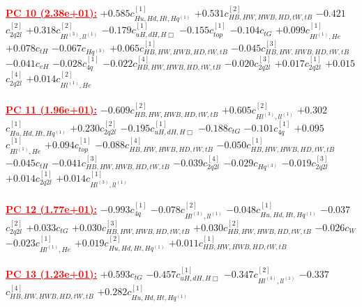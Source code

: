 \documentclass{article}
\begin{document}
\noindent \textcolor{red}{\underline{\bf{PC 10} (2.38e+01):}}
{$+0.585$}{\rm $c_{Hu,Hd,Ht,Hq^{(1)}}^{[1]}$} 
{$+0.531$}{\rm $c_{HB,HW,HWB,HD,tW,tB}^{[2]}$} 
{$-0.421$}{\rm $c_{2q2l}^{[2]}$} 
{$+0.318$}{\rm $c_{Hl^{(3)},ll^{(1)}}^{[2]}$} 
{$-0.179$}{\rm $c_{uH,dH,H\Box}^{[1]}$} 
{$-0.155$}{\rm $c_{top}^{[1]}$} 
{$-0.104$}{\rm $c_{tG}$} 
{$+0.099$}{\rm $c_{Hl^{(1)},He}^{[1]}$} 
{$+0.078$}{\rm $c_{tH}$} 
{$-0.067$}{\rm $c_{Hq^(3)}$} 
{$+0.065$}{\rm $c_{HB,HW,HWB,HD,tW,tB}^{[1]}$} 
{$-0.045$}{\rm $c_{HB,HW,HWB,HD,tW,tB}^{[3]}$} 
{$-0.041$}{\rm $c_{eH}$} 
{$-0.028$}{\rm $c_{4q}^{[1]}$} 
{$-0.022$}{\rm $c_{HB,HW,HWB,HD,tW,tB}^{[4]}$} 
{$-0.020$}{\rm $c_{2q2l}^{[3]}$} 
{$+0.017$}{\rm $c_{2q2l}^{[1]}$} 
{$+0.015$}{\rm $c_{2q2l}^{[4]}$} 
{$+0.014$}{\rm $c_{Hl^{(1)},He}^{[2]}$} 
 \nonumber \\ \nonumber \\ 
\noindent \textcolor{red}{\underline{\bf{PC 11} (1.96e+01):}}
{$-0.609$}{\rm $c_{HB,HW,HWB,HD,tW,tB}^{[2]}$} 
{$+0.605$}{\rm $c_{Hl^{(3)},ll^{(1)}}^{[2]}$} 
{$+0.302$}{\rm $c_{Hu,Hd,Ht,Hq^{(1)}}^{[1]}$} 
{$+0.230$}{\rm $c_{2q2l}^{[2]}$} 
{$-0.195$}{\rm $c_{uH,dH,H\Box}^{[1]}$} 
{$-0.188$}{\rm $c_{tG}$} 
{$-0.101$}{\rm $c_{4q}^{[1]}$} 
{$+0.095$}{\rm $c_{Hl^{(1)},He}^{[1]}$} 
{$+0.094$}{\rm $c_{top}^{[1]}$} 
{$-0.088$}{\rm $c_{HB,HW,HWB,HD,tW,tB}^{[4]}$} 
{$-0.050$}{\rm $c_{HB,HW,HWB,HD,tW,tB}^{[1]}$} 
{$-0.045$}{\rm $c_{tH}$} 
{$-0.041$}{\rm $c_{HB,HW,HWB,HD,tW,tB}^{[3]}$} 
{$-0.039$}{\rm $c_{2q2l}^{[4]}$} 
{$-0.029$}{\rm $c_{Hq^(3)}$} 
{$-0.019$}{\rm $c_{2q2l}^{[3]}$} 
{$+0.014$}{\rm $c_{2q2l}^{[1]}$} 
{$+0.014$}{\rm $c_{Hl^{(3)},ll^{(1)}}^{[1]}$} 
 \nonumber \\ \nonumber \\ 
\noindent \textcolor{red}{\underline{\bf{PC 12} (1.77e+01):}}
{$-0.993$}{\rm $c_{4q}^{[1]}$} 
{$-0.078$}{\rm $c_{Hl^{(3)},ll^{(1)}}^{[2]}$} 
{$-0.048$}{\rm $c_{Hu,Hd,Ht,Hq^{(1)}}^{[1]}$} 
{$-0.037$}{\rm $c_{2q2l}^{[2]}$} 
{$+0.033$}{\rm $c_{tG}$} 
{$+0.030$}{\rm $c_{HB,HW,HWB,HD,tW,tB}^{[3]}$} 
{$+0.030$}{\rm $c_{HB,HW,HWB,HD,tW,tB}^{[2]}$} 
{$-0.026$}{\rm $c_{W}$} 
{$-0.023$}{\rm $c_{Hl^{(1)},He}^{[1]}$} 
{$+0.019$}{\rm $c_{Hu,Hd,Ht,Hq^{(1)}}^{[2]}$} 
{$+0.011$}{\rm $c_{HB,HW,HWB,HD,tW,tB}^{[1]}$} 
 \nonumber \\ \nonumber \\ 
\noindent \textcolor{red}{\underline{\bf{PC 13} (1.23e+01):}}
{$+0.593$}{\rm $c_{tG}$} 
{$-0.457$}{\rm $c_{uH,dH,H\Box}^{[1]}$} 
{$-0.347$}{\rm $c_{Hl^{(3)},ll^{(1)}}^{[2]}$} 
{$-0.337$}{\rm $c_{HB,HW,HWB,HD,tW,tB}^{[4]}$} 
{$+0.282$}{\rm $c_{Hu,Hd,Ht,Hq^{(1)}}^{[1]}$} 
\end{document}
